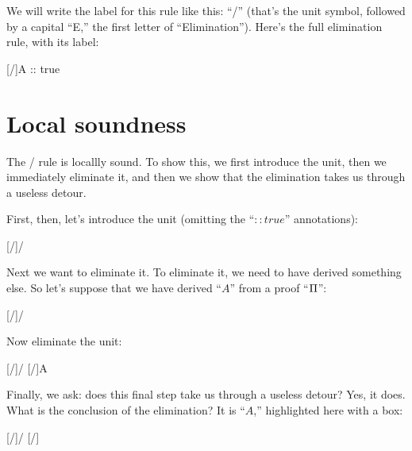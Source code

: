 \documentclass[../../../main.tex]{subfiles}
\begin{document}
We will write the label for this rule like this: ``\unitElim/'' (that's the unit symbol, followed by a capital ``E,'' the first letter of ``Elimination''). Here's the full elimination rule, with its label:

\begin{prooftree*}
  \hypo{}
  \hypo{}
  [\unitElim/]{A :: true}
\end{prooftree*}


\section{Local soundness}

The \unitElim/ rule is locallly sound. To show this, we first introduce the unit, then we immediately eliminate it, and then we show that the elimination takes us through a useless detour.

First, then, let's introduce the unit (omitting the ``$:: true$'' annotations):

\begin{prooftree*}
  \hypo{}
  [\unitIntro/]{\unit/}
\end{prooftree*}

\noindent
Next we want to eliminate it. To eliminate it, we need to have derived something else. So let's suppose that we have derived ``$A$'' from a proof ``$\Proof/$'':

\begin{prooftree*}
  \hypo{}
  [\unitIntro/]{\unit/}
  \hypo{\Proof/}
  \ellipsis{}{}
\end{prooftree*}

\noindent
Now eliminate the unit:

\begin{prooftree*}
  \hypo{}
  [\unitIntro/]{\unit/}
  \hypo{\Proof/}
  \ellipsis{}{}
  [\unitElim/]{A}
\end{prooftree*}

\noindent
Finally, we ask: does this final step take us through a useless detour? Yes, it does. What is the conclusion of the elimination? It is ``$A$,'' highlighted here with a box:

\begin{prooftree*}
  \hypo{}
  [\unitIntro/]{\unit/}
  \hypo{\Proof/}
  \ellipsis{}{}
  [\unitElim/]{}
\end{prooftree*}
\end{document}
